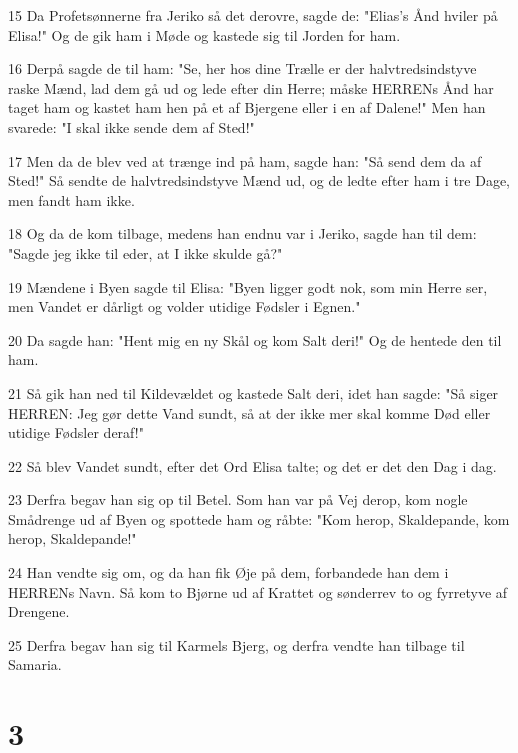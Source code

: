 \par 15 Da Profetsønnerne fra Jeriko så det derovre, sagde de: "Elias's Ånd hviler på Elisa!" Og de gik ham i Møde og kastede sig til Jorden for ham.
\par 16 Derpå sagde de til ham: "Se, her hos dine Trælle er der halvtredsindstyve raske Mænd, lad dem gå ud og lede efter din Herre; måske HERRENs Ånd har taget ham og kastet ham hen på et af Bjergene eller i en af Dalene!" Men han svarede: "I skal ikke sende dem af Sted!"
\par 17 Men da de blev ved at trænge ind på ham, sagde han: "Så send dem da af Sted!" Så sendte de halvtredsindstyve Mænd ud, og de ledte efter ham i tre Dage, men fandt ham ikke.
\par 18 Og da de kom tilbage, medens han endnu var i Jeriko, sagde han til dem: "Sagde jeg ikke til eder, at I ikke skulde gå?"
\par 19 Mændene i Byen sagde til Elisa: "Byen ligger godt nok, som min Herre ser, men Vandet er dårligt og volder utidige Fødsler i Egnen."
\par 20 Da sagde han: "Hent mig en ny Skål og kom Salt deri!" Og de hentede den til ham.
\par 21 Så gik han ned til Kildevældet og kastede Salt deri, idet han sagde: "Så siger HERREN: Jeg gør dette Vand sundt, så at der ikke mer skal komme Død eller utidige Fødsler deraf!"
\par 22 Så blev Vandet sundt, efter det Ord Elisa talte; og det er det den Dag i dag.
\par 23 Derfra begav han sig op til Betel. Som han var på Vej derop, kom nogle Smådrenge ud af Byen og spottede ham og råbte: "Kom herop, Skaldepande, kom herop, Skaldepande!"
\par 24 Han vendte sig om, og da han fik Øje på dem, forbandede han dem i HERRENs Navn. Så kom to Bjørne ud af Krattet og sønderrev to og fyrretyve af Drengene.
\par 25 Derfra begav han sig til Karmels Bjerg, og derfra vendte han tilbage til Samaria.

\chapter{3}

